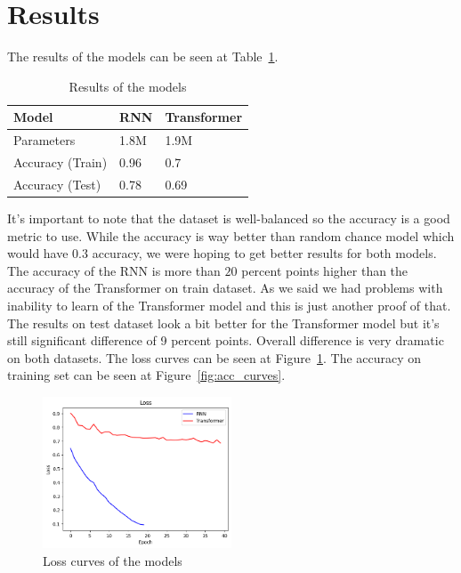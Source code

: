 \documentclass{article}
\begin{document}
    \section{Results}
    The results of the models can be seen at Table~\ref{tab:results}.
    \begin{table}[h!]
        \centering
        \begin{tabular}{ | m{5em} | m{2cm}| m{3cm} | } 
            \hline
            Model & RNN & Transformer \\
            \hline
            Parameters & 1.8M & 1.9M \\
            \hline
            Accuracy (Train) & 0.96 & 0.7 \\
            \hline
            Accuracy (Test) & 0.78 & 0.69 \\
            \hline
        \end{tabular}
        \caption{Results of the models}
        \label{tab:results}
    \end{table}
    It's important to note that the dataset is well-balanced so the accuracy is a good metric to use.
    While the accuracy is way better than random chance model which would have $0.3$ accuracy, we were hoping to get better results for both models.
    The accuracy of the RNN is more than $20$ percent points higher than the accuracy of the Transformer on train dataset.
    As we said we had problems with inability to learn of the Transformer model and this is just another proof of that.
    The results on test dataset look a bit better for the Transformer model but it's still significant difference of 9 percent points.
    Overall difference is very dramatic on both datasets.
    The loss curves can be seen at Figure~\ref{fig:loss_curves}.
    The accuracy on training set can be seen at Figure~\ref{fig:acc_curves}.
    \begin{figure}[h!]
        \centering
        \includegraphics[width=0.5\textwidth]{Loss.png}
        \caption{Loss curves of the models}
        \label{fig:loss_curves}
    \end{figure}
\end{document}
